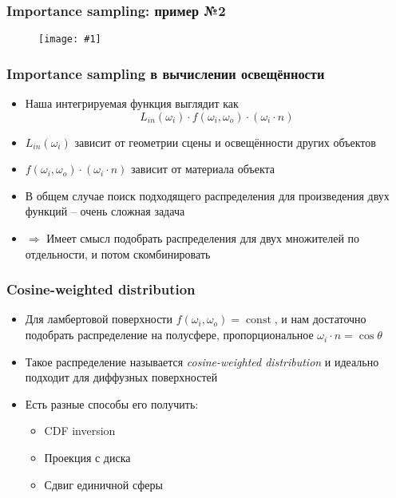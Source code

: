 \documentclass[handout,10pt]{beamer}
\newcommand{\slideimage}[1]{
  \begin{figure}
    \begin{adjustbox}{width=\textwidth, totalheight=\textheight-2\baselineskip-2\baselineskip,keepaspectratio}
      \texttt{[image: \#1]}
    \end{adjustbox}
  \end{figure}
}
\begin{document}
\begin{frame}
\frametitle{Importance sampling: пример №2}
\slideimage{is_plot_2.png}
\end{frame}

\begin{frame}
\frametitle{Importance sampling в вычислении освещённости}
\begin{itemize}
\item Наша интегрируемая функция выглядит как
\begin{equation*}
L_{in}(\omega_i) \cdot f(\omega_i, \omega_o) \cdot (\omega_i \cdot n)
\end{equation*}
\pause
\item \begin{math}L_{in}(\omega_i)\end{math} зависит от геометрии сцены и освещённости других объектов
\pause
\item \begin{math}f(\omega_i, \omega_o) \cdot (\omega_i \cdot n)\end{math} зависит от материала объекта
\pause
\item В общем случае поиск подходящего распределения для произведения двух функций -- очень сложная задача
\pause
\item \begin{math}\Longrightarrow\end{math} Имеет смысл подобрать распределения для двух множителей по отдельности, и потом скомбинировать
\end{itemize}
\end{frame}

\begin{frame}
\frametitle{Cosine-weighted distribution}
\begin{itemize}
\item Для ламбертовой поверхности \begin{math}f(\omega_i, \omega_o) = \operatorname{const}\end{math}, и нам достаточно подобрать распределение на полусфере, пропорциональное \begin{math}\omega_i \cdot n=\cos \theta\end{math}
\pause
\item Такое распределение называется \textit{cosine-weighted distribution} и идеально подходит для диффузных поверхностей
\pause
\item Есть разные способы его получить:
\pause
\begin{itemize}
\item CDF inversion
\item Проекция с диска
\item Сдвиг единичной сферы
\end{itemize}
\end{itemize}
\end{frame}
\end{document}
